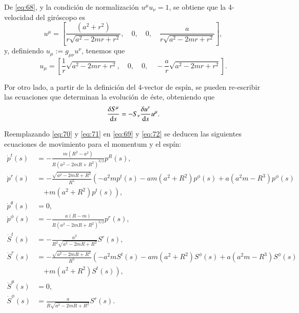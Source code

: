 De \eqref{eq:68}, y la condición de normalización $u^{\mu}u_{\nu} = 1$, se obtiene que la 4-velocidad del giróscopo es
\begin{equation}
\label{eq:70}
u^{\mu} = \left [ \frac{\left(a^{2} + r^{2}\right)}{r\sqrt{a^{2} - 2 m r + r^{2}}}, \quad 0, \quad 0, \quad \frac{a}{r\sqrt{a^{2} - 2 m r + r^{2}}}\right ],
\end{equation}
y, definiendo $u_{\mu} := g_{\mu \nu} u^{\nu}$, tenemos que
\begin{equation}
\label{eq:71}
u_{\mu} = \left [ \frac{1}{r}\sqrt{a^{2} - 2 m r + r^{2}}, \quad 0, \quad 0, \quad -\frac{a}{r} \sqrt{a^{2} - 2 m r + r^{2}} \right ].
\end{equation}

Por otro lado, a partir de la definición del 4-vector de espín, se pueden re-escribir las ecuaciones que determinan la evolución de éste, obteniendo que
\begin{equation}
\label{eq:72}
\frac{\delta S^{\mu}}{\mathrm{d}s} = -S_{\nu} \frac{\delta u^{\nu}}{\mathrm{d}s} u^{\mu}.
\end{equation}

Reemplazando \eqref{eq:70} y \eqref{eq:71} en \eqref{eq:69} y \eqref{eq:72} se deducen las siguientes ecuaciones de movimiento para el momentum y el espín:
\begin{align}
\dot{p}^t(s) &= -\frac{m(R^2-a^2)}{R(a^2-2mR+R^2)^{3/2}} p^R(s),\\
\nonumber
\dot{p}^r(s) &= -\frac{\sqrt{a^2-2mR+R^2}}{R^5} \left( -a^{2}m p^t(s) - a m \left(a^{2} + R^{2}\right) p^{\phi}(s) + a \left(a^{2} m - R^{3}\right) p^{\phi}(s) \right.\\
& \quad \left. + m \left(a^{2} + R^{2} \right) p^t(s) \right),\\
\dot{p}^{\theta}(s) &= 0,\\
\dot{p}^{\phi}(s) &= -\frac{a(R-m)}{R(a^2-2mR+R^2)^{3/2}} p^r(s),\\
\dot{S}^t(s) &= -\frac{a^2}{R^2 \sqrt{a^2-2mR + R^2}} S^r(s),\\
\nonumber
\dot{S}^r(s) &= -\frac{\sqrt{a^2-2mR+R^2}}{R^5} \left( - a^{2} m S^t(s) - a m \left(a^{2} + R^{2}\right) S^{\phi}(s) + a \left(a^{2} m - R^{3}\right) S^{\phi}(s) \right.\\
& \quad \left. + m \left(a^{2} + R^{2} \right) S^t(s) \right),\\
\dot{S}^{\theta}(s) &= 0,\\
\dot{S}^{\phi}(s) &= \frac{a}{R\sqrt{a^2-2mR+R^2}} S^r(s).
\end{align} 

